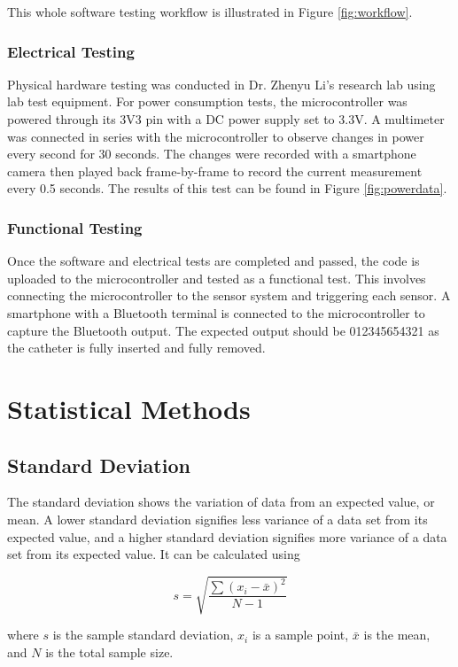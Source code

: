 \documentclass[12pt]{article}
\begin{document}
This whole software testing workflow is illustrated in Figure \ref{fig:workflow}.

\subsubsection{Electrical Testing}
Physical hardware testing was conducted in Dr. Zhenyu Li's research lab using lab test equipment. For power consumption tests, the microcontroller was powered through its 3V3 pin with a DC power supply set to 3.3V. A multimeter was connected in series with the microcontroller to observe changes in power every second for 30 seconds. The changes were recorded with a smartphone camera then played back frame-by-frame to record the current measurement every 0.5 seconds. The results of this test can be found in Figure \ref{fig:powerdata}.

\subsubsection{Functional Testing}
Once the software and electrical tests are completed and passed, the code is uploaded to the microcontroller and tested as a functional test. This involves connecting the microcontroller to the sensor system and triggering each sensor. A smartphone with a Bluetooth terminal is connected to the microcontroller to capture the Bluetooth output. The expected output should be 012345654321 as the catheter is fully inserted and fully removed.

\section{Statistical Methods}
\subsection{Standard Deviation}
The standard deviation shows the variation of data from an expected value, or mean. A lower standard deviation signifies less variance of a data set from its expected value, and a higher standard deviation signifies more variance of a data set from its expected value. It can be calculated using

\begin{equation}
    s = \sqrt{\frac{\sum{(x_i - \bar{x})^2}}{N-1}}
    \label{eq:std}
\end{equation}

where $s$ is the sample standard deviation, $x_i$ is a sample point, $\bar{x}$ is the mean, and $N$ is the total sample size.
\end{document}
